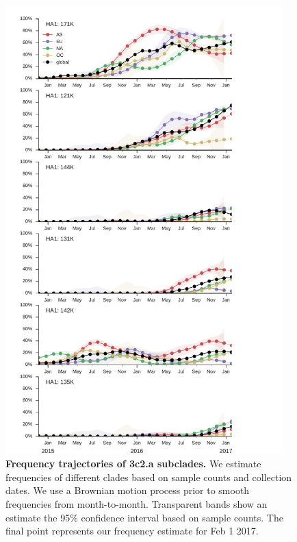 \documentclass[11pt,oneside,letterpaper]{article}
\begin{document}
\pagebreak

\begin{figure}[H]
	\centering
	\includegraphics[width=0.95\textwidth]{../figures/feb-2017/h3n2_frequencies.pdf}
	\caption{\textbf{Frequency trajectories of 3c2.a subclades.}
	We estimate frequencies of different clades based on sample counts and collection dates.
	We use a Brownian motion process prior to smooth frequencies from month-to-month.
	Transparent bands show an estimate the 95\% confidence interval based on sample counts.
	The final point represents our frequency estimate for Feb 1 2017.
	}
	\label{H3N2_mutations}
\end{figure}

\pagebreak
\end{document}
